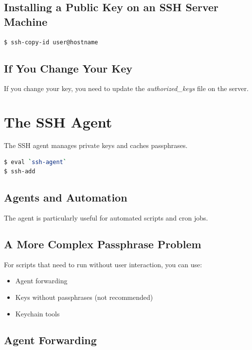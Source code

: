 \documentclass[12pt]{book}
\begin{document}
\subsection{Installing a Public Key on an SSH Server Machine}

\begin{lstlisting}[language=bash]
$ ssh-copy-id user@hostname
\end{lstlisting}

\subsection{If You Change Your Key}

If you change your key, you need to update the \textit{authorized\_keys} file on the server.

\section{The SSH Agent}

The SSH agent manages private keys and caches passphrases.

\begin{lstlisting}[language=bash]
$ eval `ssh-agent`
$ ssh-add
\end{lstlisting}

\subsection{Agents and Automation}

The agent is particularly useful for automated scripts and cron jobs.

\subsection{A More Complex Passphrase Problem}

For scripts that need to run without user interaction, you can use:
\begin{itemize}
    \item Agent forwarding
    \item Keys without passphrases (not recommended)
    \item Keychain tools
\end{itemize}

\subsection{Agent Forwarding}
\end{document}
